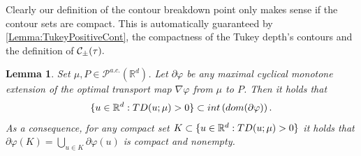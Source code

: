 \documentclass[11pt]{article}
\DeclareMathOperator{\supp}{supp}
\newcommand{\R}{\mathbb{R}}
\theoremstyle{plain}
\newtheorem{lemma}[sectioncount]{Lemma}
\theoremstyle{definition}
\begin{document}
Clearly our definition of the contour breakdown point  only makes sense if  the contour sets are compact. This is automatically guaranteed by 
\autoref{Lemma:TukeyPositiveCont}, the compactness of the Tukey depth's   {contours} and the definition of $\cal C_{\pm}(\tau).$


\begin{lemma}
\label{Lemma:TukeyPositiveCont} 
    Set $\mu,P\in \mathcal{P}^{a.c.}(\R^d)$. Let $\partial \varphi$ be any maximal {  cyclical} monotone extension of  the optimal transport map $\nabla \varphi$ from $\mu$ to $P$.  Then it holds that 
    \begin{equation}
        \label{eq:TukeyPositiveCont}
        \{u\in \R^d: 
    {\rm TD}(u;\mu)>0\}\subset {\rm int}\left({\rm dom}(\partial \varphi)\right).
    \end{equation}
    As a consequence, for any compact set $K\subset \{u\in \R^d: 
    {\rm TD}(u;\mu)>0\}$ it holds that 
    $\partial \varphi(K)=\bigcup_{u\in K} \partial \varphi(u)$ is  compact and nonempty.
\end{lemma}


\end{document}
